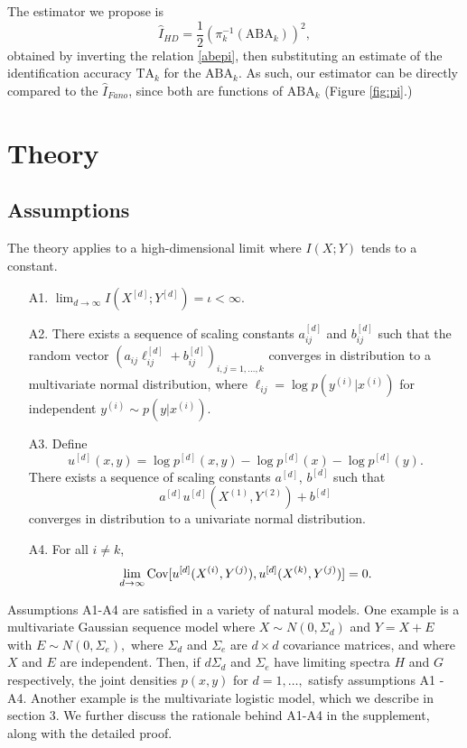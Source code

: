 The estimator we propose is
\begin{equation}\label{eq:hat_i_hd}
\hat{I}_{HD} = \frac{1}{2}(\pi_{k}^{-1}(\text{ABA}_k))^2,
\end{equation}
obtained by inverting the relation \eqref{abepi}, then substituting
an estimate of the identification accuracy $\text{TA}_k$ for the $\text{ABA}_k$.  As such,
our estimator can be directly compared to the $\hat{I}_{Fano}$, since
both are functions of $\text{ABA}_k$ (Figure \ref{fig:pi}.)

\section{Theory}

\subsection{Assumptions}\label{sec:ch5_assumptions}

The theory applies to a high-dimensional limit where $I(X; Y)$ tends to a constant.

\begin{itemize}
\item[A1.] $\lim_{d \to \infty} I(X^{[d]}; Y^{[d]}) = \iota < \infty.$
\item[A2.] There exists a sequence of scaling constants $a_{ij}^{[d]}$
and $b_{ij}^{[d]}$ such that the random vector $(a_{ij}\ell_{ij}^{[d]} +
b_{ij}^{[d]})_{i, j = 1,\hdots, k}$ converges in distribution to a
multivariate normal distribution,
where $\ell_{ij} = \log p(y^{(i)}|x^{(i)})$ for independent $y^{(i)} \sim p(y|x^{(i)})$.
\item[A3.] Define \[
u^{[d]}(x, y) = \log p^{[d]}(x, y) - \log p^{[d]}(x) - \log p^{[d]}(y).
\]
There exists a sequence of scaling constants $a^{[d]}$, $b^{[d]}$ such that
\[
a^{[d]}u^{[d]}(X^{(1)}, Y^{(2)}) + b^{[d]}
\]
converges in distribution to a univariate normal distribution.
\item[A4.] For all $i \neq k$,
\[\lim_{d \to \infty}\text{Cov}[u^{[d]}(X^{(i)}, Y^{(j)}), u^{[d]}(X^{(k)}, Y^{(j)})] = 0.\]
\end{itemize}

Assumptions A1-A4 are satisfied in a variety of natural models.  One
example is a multivariate Gaussian sequence model where $X \sim N(0,
\Sigma_d)$ and $ Y = X + E $ with $ E \sim N(0, \Sigma_e), $ where
$\Sigma_d$ and $\Sigma_e$ are $d \times d$ covariance matrices, and
where $X$ and $E$ are independent.  Then, if $d \Sigma_d$ and
$\Sigma_e$ have limiting spectra $H$ and $G$ respectively, the joint
densities $p(x, y)$ for $d = 1,\hdots, $ satisfy assumptions A1 - A4.
Another example is the multivariate logistic model, which we describe
in section 3.  We further discuss the rationale behind A1-A4 in the
supplement, along with the detailed proof.

